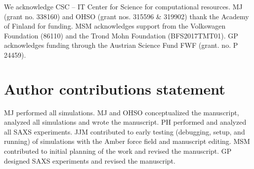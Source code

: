 \documentclass[journal=jctcce]{achemso}
\begin{document}
\begin{acknowledgement}
We acknowledge CSC -- IT Center for Science for computational resources.
%
MJ (grant no. 338160) and OHSO (grant nos. 315596 \& 319902) thank the Academy of Finland for funding.
MSM acknowledges support from the Volkswagen Foundation (86110) and the Trond Mohn Foundation (BFS2017TMT01).
GP acknowledges funding through the Austrian Science Fund FWF (grant. no. P 24459).

\end{acknowledgement}

\section*{Author contributions statement}

MJ performed all simulations.
MJ and OHSO conceptualized the manuscript, analyzed all simulations and wrote the manuscript.
PH performed and analyzed all SAXS experiments.
JJM contributed to early testing (debugging, setup, and running) of simulations with the Amber force field and manuscript editing.
MSM contributed to initial planning of the work and revised the manuscript.
GP designed SAXS experiments and revised the manuscript.


\end{document}
